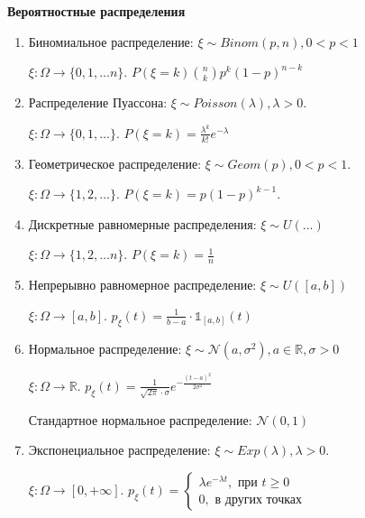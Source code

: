 \begin{example}
    \textbf{Вероятностные распределения}

    \begin{enumerate}
        \item {
            Биномиальное распределение: $\xi \sim Binom(p, n), 0 < p < 1$

            $\xi : \Omega \to \{ 0, 1, \ldots n \}$. $P(\xi = k) \binom{n}{k} p^k (1 - p)^{n - k}$ 
        }
        \item {
            Распределение Пуассона: $\xi \sim Poisson(\lambda), \lambda > 0$.

            $\xi : \Omega \to \{ 0, 1, \ldots \}$. $P(\xi = k) = \frac{\lambda^k}{k!}e^{-\lambda}$
        }
        \item {
            Геометрическое распределение: $\xi \sim Geom(p), 0 < p < 1$.

            $\xi : \Omega \to \{ 1, 2, \ldots \}$. $P(\xi = k) = p(1 - p)^{k - 1}$.
        }
        \item {
            Дискретные равномерные распределения: $\xi \sim U(\ldots)$

            $\xi : \Omega \to \{ 1, 2, \ldots n \}$. $P(\xi = k) = \frac{1}{n}$
        }
        \item {
            Непрерывно равномерное распределение: $\xi \sim U([a, b])$

            $\xi : \Omega \to [a, b]$. $p_{\xi}(t) = \frac{1}{b - a} \cdot \mathds{1}_{[a, b]} (t)$
        }
        \item {
            Нормальное распределение: $\xi \sim \mathcal{N} (a, \sigma^2), a \in \mathbb{R}, \sigma > 0$

            $\xi : \Omega \to \mathbb{R}$. $p_{\xi}(t) = \frac{1}{\sqrt{2\pi} \cdot \sigma} e^{-\frac{(t - a)^2}{2\sigma^2}}$

            Стандартное нормальное распределение: $\mathcal{N} (0, 1)$
        }
        \item {
            Экспонециальное распределение: $\xi \sim Exp(\lambda), \lambda > 0$.

            $\xi : \Omega \to [0, +\infty]$. $p_{\xi}(t) = \begin{cases}
                \lambda e^{-\lambda t}, \text{ при } t \geqslant 0 \\
                0, \text{ в других точках}
            \end{cases}$
        }
    \end{enumerate}


\end{example}

